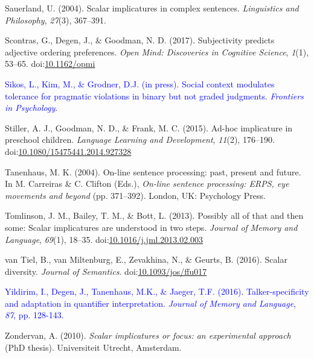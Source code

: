 \documentclass[man]{apa6}
\newcommand{\change}[1]{\textcolor{Blue}{#1}}
\theoremstyle{definition}
\theoremstyle{definition}
\theoremstyle{definition}
\theoremstyle{remark}
\begin{document}
\hypertarget{ref-sauerland2004scalar}{}
Sauerland, U. (2004). Scalar implicatures in complex sentences.
\emph{Linguistics and Philosophy}, \emph{27}(3), 367--391.

\hypertarget{ref-Scontras2017}{}
Scontras, G., Degen, J., \& Goodman, N. D. (2017). Subjectivity predicts
adjective ordering preferences. \emph{Open Mind: Discoveries in
Cognitive Science}, \emph{1}(1), 53--65.
doi:\href{https://doi.org/10.1162/opmi}{10.1162/opmi}

\change{\hypertarget{ref-Sikos2019}{}
Sikos, L., Kim, M., \& Grodner, D.J. (in press). Social context modulates tolerance for pragmatic violations in binary but not graded judgments. \emph{Frontiers in Psychology}.}

\hypertarget{ref-Stiller2015}{}
Stiller, A. J., Goodman, N. D., \& Frank, M. C. (2015). Ad-hoc
implicature in preschool children. \emph{Language Learning and
Development}, \emph{11}(2), 176--190.
doi:\href{https://doi.org/10.1080/15475441.2014.927328}{10.1080/15475441.2014.927328}

\hypertarget{ref-Tanenhaus2004}{}
Tanenhaus, M. K. (2004). On-line sentence processing: past, present and
future. In M. Carreiras \& C. Clifton (Eds.), \emph{On-line sentence
processing: ERPS, eye movements and beyond} (pp. 371--392). London, UK:
Psychology Press.

\hypertarget{ref-Tomlinson2013}{}
Tomlinson, J. M., Bailey, T. M., \& Bott, L. (2013). Possibly all of
that and then some: Scalar implicatures are understood in two steps.
\emph{Journal of Memory and Language}, \emph{69}(1), 18--35.
doi:\href{https://doi.org/10.1016/j.jml.2013.02.003}{10.1016/j.jml.2013.02.003}

\hypertarget{ref-VanTiel2014}{}
van Tiel, B., van Miltenburg, E., Zevakhina, N., \& Geurts, B. (2016).
Scalar diversity. \emph{Journal of Semantics}.
doi:\href{https://doi.org/10.1093/jos/ffu017}{10.1093/jos/ffu017}

\change{\hypertarget{ref-Yildirim2016}{}
Yildirim, I., Degen, J., Tanenhaus, M.K., \& Jaeger, T.F. (2016). Talker-specificity and adaptation in quantifier interpretation. \emph{Journal of Memory and Language}, \emph{87}, pp. 128-143.}


\hypertarget{ref-Zondervan2010}{}
Zondervan, A. (2010). \emph{Scalar implicatures or focus: an
experimental approach} (PhD thesis). Universiteit Utrecht, Amsterdam.
\end{document}
